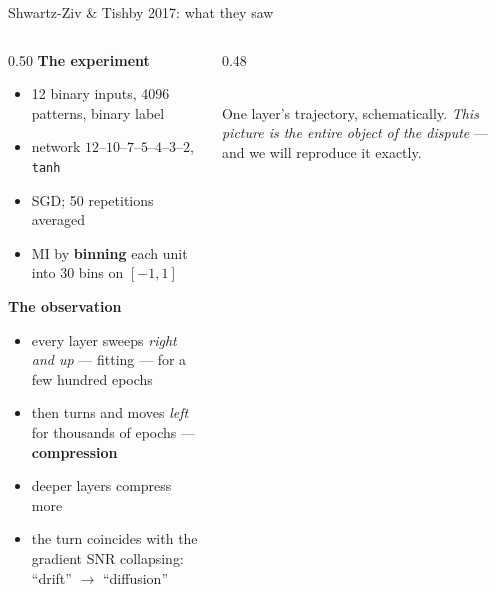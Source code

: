 \documentclass[aspectratio=169,11pt]{beamer}
\newcommand{\I}{\mathrm{I}}
\newcommand{\HH}{\mathrm{H}}
\begin{document}
\begin{frame}{Shwartz-Ziv \& Tishby 2017: what they saw}
\begin{columns}[T]
\begin{column}{0.50\textwidth}
\textbf{The experiment}
\begin{itemize}\small
  \item 12 binary inputs, 4096 patterns, binary label
  \item network $12$--$10$--$7$--$5$--$4$--$3$--$2$, \texttt{tanh}
  \item SGD; \SI{50}{} repetitions averaged
  \item MI by \textbf{binning} each unit into 30 bins on $[-1,1]$
\end{itemize}
\medskip
\textbf{The observation}
\begin{itemize}\small
  \item every layer sweeps \emph{right and up} --- fitting --- for a few hundred epochs
  \item then turns and moves \textcolor{bad}{\emph{left}} for thousands of epochs ---
        \textbf{compression}
  \item deeper layers compress more
  \item the turn coincides with the gradient SNR collapsing:
        ``drift'' $\to$ ``diffusion''
\end{itemize}
\end{column}
\begin{column}{0.48\textwidth}
\centering
{}\\[4pt]
\footnotesize
One layer's trajectory, schematically. \emph{This picture is the entire object of the
dispute} --- and we will reproduce it exactly.
\end{column}
\end{columns}
\end{frame}
\end{document}
